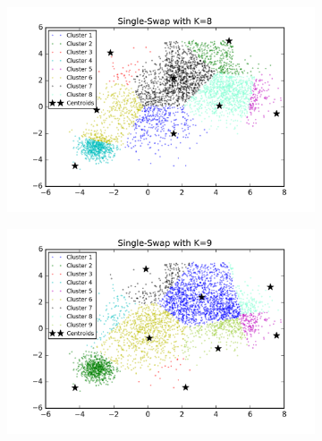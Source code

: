 \begin{description}
\begin{description}
\begin{figure}[!h]
\begin{subfigure}[b]{0.475\textwidth}
        \end{subfigure}
        \hfill
        \begin{subfigure}[b]{0.475\textwidth}  
            \centering 
            \includegraphics[width=\textwidth]{./figures/bigClustering_singleSwap_8.png}
        \end{subfigure}
        \begin{subfigure}[b]{0.475\textwidth}   
            \centering 
            \includegraphics[width=\textwidth]{./figures/bigClustering_singleSwap_9.png}
        \end{subfigure}
        \hfill
        \begin{subfigure}[b]{0.475\textwidth}   
            \centering 

\end{subfigure}
\end{figure}
\end{description}
\end{description}
